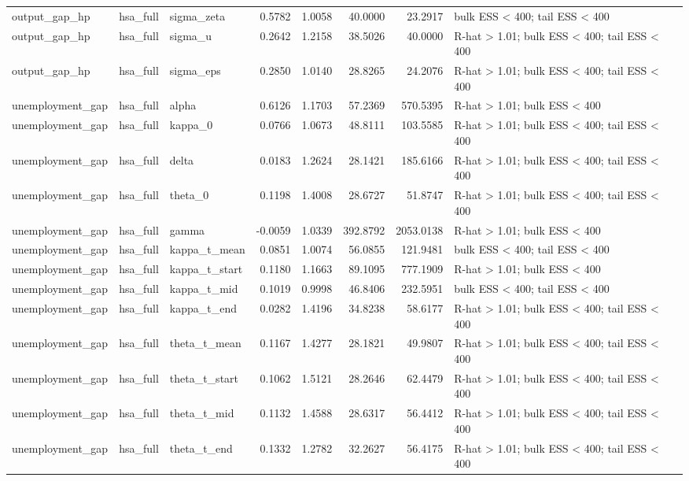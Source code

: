 \begin{tabular}{lllrrrrl}
output\_gap\_hp & hsa\_full & sigma\_zeta & 0.5782 & 1.0058 & 40.0000 & 23.2917 & bulk ESS < 400; tail ESS < 400 \\
output\_gap\_hp & hsa\_full & sigma\_u & 0.2642 & 1.2158 & 38.5026 & 40.0000 & R-hat > 1.01; bulk ESS < 400; tail ESS < 400 \\
output\_gap\_hp & hsa\_full & sigma\_eps & 0.2850 & 1.0140 & 28.8265 & 24.2076 & R-hat > 1.01; bulk ESS < 400; tail ESS < 400 \\
unemployment\_gap & hsa\_full & alpha & 0.6126 & 1.1703 & 57.2369 & 570.5395 & R-hat > 1.01; bulk ESS < 400 \\
unemployment\_gap & hsa\_full & kappa\_0 & 0.0766 & 1.0673 & 48.8111 & 103.5585 & R-hat > 1.01; bulk ESS < 400; tail ESS < 400 \\
unemployment\_gap & hsa\_full & delta & 0.0183 & 1.2624 & 28.1421 & 185.6166 & R-hat > 1.01; bulk ESS < 400; tail ESS < 400 \\
unemployment\_gap & hsa\_full & theta\_0 & 0.1198 & 1.4008 & 28.6727 & 51.8747 & R-hat > 1.01; bulk ESS < 400; tail ESS < 400 \\
unemployment\_gap & hsa\_full & gamma & -0.0059 & 1.0339 & 392.8792 & 2053.0138 & R-hat > 1.01; bulk ESS < 400 \\
unemployment\_gap & hsa\_full & kappa\_t\_mean & 0.0851 & 1.0074 & 56.0855 & 121.9481 & bulk ESS < 400; tail ESS < 400 \\
unemployment\_gap & hsa\_full & kappa\_t\_start & 0.1180 & 1.1663 & 89.1095 & 777.1909 & R-hat > 1.01; bulk ESS < 400 \\
unemployment\_gap & hsa\_full & kappa\_t\_mid & 0.1019 & 0.9998 & 46.8406 & 232.5951 & bulk ESS < 400; tail ESS < 400 \\
unemployment\_gap & hsa\_full & kappa\_t\_end & 0.0282 & 1.4196 & 34.8238 & 58.6177 & R-hat > 1.01; bulk ESS < 400; tail ESS < 400 \\
unemployment\_gap & hsa\_full & theta\_t\_mean & 0.1167 & 1.4277 & 28.1821 & 49.9807 & R-hat > 1.01; bulk ESS < 400; tail ESS < 400 \\
unemployment\_gap & hsa\_full & theta\_t\_start & 0.1062 & 1.5121 & 28.2646 & 62.4479 & R-hat > 1.01; bulk ESS < 400; tail ESS < 400 \\
unemployment\_gap & hsa\_full & theta\_t\_mid & 0.1132 & 1.4588 & 28.6317 & 56.4412 & R-hat > 1.01; bulk ESS < 400; tail ESS < 400 \\
unemployment\_gap & hsa\_full & theta\_t\_end & 0.1332 & 1.2782 & 32.2627 & 56.4175 & R-hat > 1.01; bulk ESS < 400; tail ESS < 400 \\

\end{tabular}
